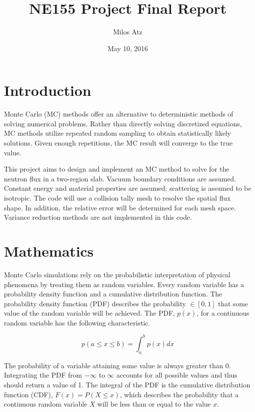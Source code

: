 \documentclass[11pt, oneside]{article}   	%
\title{NE155 Project Final Report}
\author{Milos Atz}
\date{May 10, 2016}
\begin{document}
\maketitle

\section{Introduction}

Monte Carlo (MC) methods offer an alternative to deterministic methods of solving numerical problems. Rather than directly solving discretized equations, MC methods utilize repeated random sampling to obtain statistically likely solutions. Given enough repetitions, the MC result will converge to the true value. 

This project aims to design and implement an MC method to solve for the neutron flux in a two-region slab. Vacuum boundary conditions are assumed. Constant energy and material properties are assumed; scattering is assumed to be isotropic. The code will use a collision tally mesh to resolve the spatial flux shape. In addition, the relative error will be determined for each mesh space. Variance reduction methods are not implemented in this code.

\section{Mathematics}

Monte Carlo simulations rely on the probabilistic interpretation of physical phenomena by treating them as random variables. Every random variable has a probability density function and a cumulative distribution function. The probability density function (PDF) describes the probability $\in [0, 1]$ that some value of the random variable will be achieved. The PDF, $p(x)$, for a continuous random variable has the following characteristic.

\begin{equation}
p(a \leq x \leq b) = \int_{a}^{b}p(x)dx
\end{equation}

The probability of a variable attaining some value is always greater than 0. Integrating the PDF from $-\infty$ to $\infty$ accounts for all possible values and thus should return a value of 1. The integral of the PDF is the cumulative distribution function (CDF), $F(x)=P(X \leq x)$, which describes the probability that a continuous random variable $X$ will be less than or equal to the value $x$.
\end{document}

